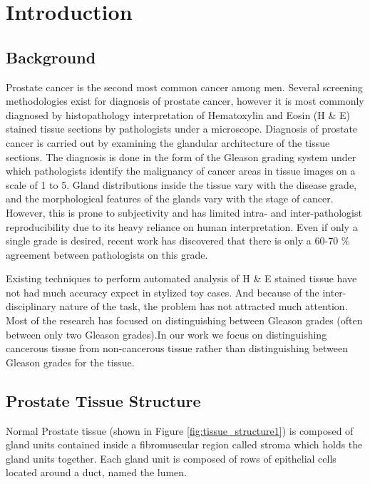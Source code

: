 \section{Introduction}
\label{sec:introduction}

\subsection{Background}
Prostate cancer is the second most common cancer
among men. Several screening methodologies exist for diagnosis of prostate cancer, however it is most commonly diagnosed by histopathology interpretation of Hematoxylin and Eosin (H \& E) stained tissue sections by pathologists under a microscope. Diagnosis of prostate cancer is carried out by examining the glandular architecture of the tissue sections. The diagnosis is done in the form of the Gleason grading system \cite{gleason1966classification} under which pathologists identify the malignancy of cancer areas in tissue images on a scale of 1 to 5. Gland distributions inside the tissue vary with the disease grade, and the morphological features of the glands vary with the stage of cancer. However, this is prone to subjectivity and has limited intra- and inter-pathologist reproducibility due to its heavy reliance on human interpretation. Even if only a single grade is desired, recent work has discovered that there is only a 60-70 \% agreement between pathologists on this grade.


Existing techniques to perform automated analysis of H \& E stained tissue have not had much accuracy expect in stylized toy cases. And because of the inter-disciplinary nature of the task, the problem has not attracted much attention. Most of the research has focused on distinguishing between Gleason grades (often between only two Gleason grades).In our work we focus on distinguishing cancerous tissue from non-cancerous tissue rather than distinguishing between Gleason grades for the tissue.

\subsection{Prostate Tissue Structure}
Normal Prostate tissue (shown in Figure \ref{fig:tissue_structure1}) is composed of gland units contained inside a fibromuscular region called stroma which holds the gland units together. Each gland unit is composed of rows of epithelial cells located around a duct, named the lumen. 

